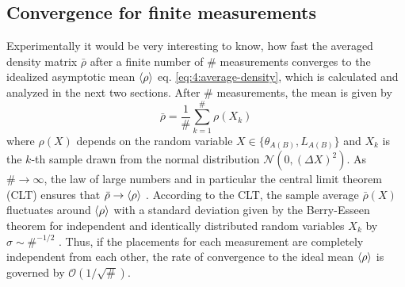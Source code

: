 \subsection*{Convergence for finite measurements}
Experimentally it would be very interesting to know, how fast the averaged density matrix $\bar{\rho}$ after a finite number of $\#$ measurements converges to the idealized asymptotic mean $\left\langle\rho\right\rangle$ eq. \eqref{eq:4:average-density}, which is calculated and analyzed in the next two sections.
After $\#$ measurements, the mean is given by
\begin{equation}
  \bar{\rho} = \frac{1}{\#} \sum_{k=1}^{\#} \rho(X_k)
\end{equation}
where $\rho(X)$ depends on the random variable $X \in \{\theta_{A(B)}, L_{A(B)}\}$ and $X_k$ is the $k$-th sample drawn from the normal distribution $\mathcal{N}(0, (\Delta X)^2)$.
As $\# \rightarrow \infty$, the law of large numbers and in particular the central limit theorem (CLT) ensures that $\bar{\rho} \rightarrow \left\langle\rho\right\rangle$ \cite[p. 1195]{Riley_2018}.
According to the CLT, the sample average $\bar{\rho}(X)$ fluctuates around $\left\langle\rho\right\rangle$ with a standard deviation given by the Berry-Esseen theorem for independent and identically distributed random variables $X_k$ by $\sigma \sim \#^{-1/2}$ \cite{Berry_1941}.
Thus, if the placements for each measurement are completely independent from each other, the rate of convergence to the ideal mean $\left\langle\rho\right\rangle$ is governed by $\mathcal{O}(1/\sqrt{\#})$.

